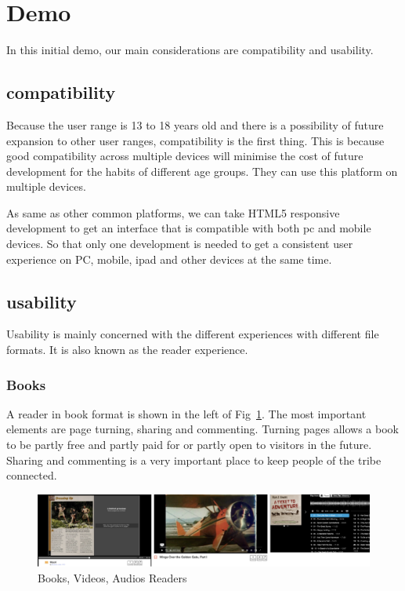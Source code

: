 \section{Demo}

In this initial demo, our main considerations are compatibility and usability.

\subsection{compatibility}

Because the user range is 13 to 18 years old and there is a possibility of future expansion to other user ranges, compatibility is the first thing. 
This is because good compatibility across multiple devices will minimise the cost of future development for the habits of different age groups.
They can use this platform on multiple devices.

As same as other common platforms, we can take HTML5 responsive development to get an interface that is compatible with both pc and mobile devices.
So that only one development is needed to get a consistent user experience on PC, mobile, ipad and other devices at the same time.

\subsection{usability}

Usability is mainly concerned with the different experiences with different file formats.
It is also known as the reader experience. 

\subsubsection{Books}

A reader in book format is shown in the left of Fig~\ref{fig31}.
The most important elements are page turning, sharing and commenting. 
Turning pages allows a book to be partly free and partly paid for or partly open to visitors in the future. 
Sharing and commenting is a very important place to keep people of the tribe connected. 

\begin{figure}[htbp]
  \centerline{\includegraphics[width=500pt]{images/Book.png}}
  \caption{Books, Videos, Audios Readers}
  \label{fig31}
\end{figure}

